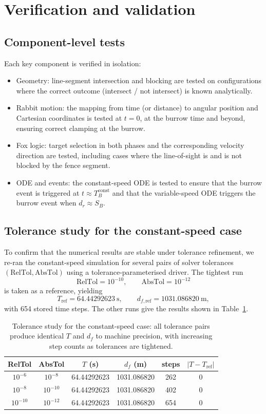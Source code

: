 \documentclass[a4paper,11pt]{article}
\begin{document}
\section{Verification and validation}

\subsection{Component-level tests}

Each key component is verified in isolation:

\begin{itemize}
  \item Geometry: line-segment intersection and blocking are tested on configurations where the correct outcome (intersect / not intersect) is known analytically.
  \item Rabbit motion: the mapping from time (or distance) to angular position and Cartesian coordinates is tested at $t=0$, at the burrow time and beyond, ensuring correct clamping at the burrow.
  \item Fox logic: target selection in both phases and the corresponding velocity direction are tested, including cases where the line-of-sight is and is not blocked by the fence segment.
  \item ODE and events: the constant-speed ODE is tested to ensure that the burrow event is triggered at $t\approx T_B^{\text{const}}$ and that the variable-speed ODE triggers the burrow event when $d_r\approx S_B$.
\end{itemize}

\subsection{Tolerance study for the constant-speed case}

To confirm that the numerical results are stable under tolerance refinement, we re-ran the constant-speed simulation for several pairs of solver tolerances $(\text{RelTol},\text{AbsTol})$ using a tolerance-parameterised driver. The tightest run
\[
\text{RelTol} = 10^{-10},\qquad \text{AbsTol} = 10^{-12}
\]
is taken as a reference, yielding
\[
T_\text{ref} = 64.44292623\ \text{s},\qquad d_{f,\text{ref}} = 1031.086820\ \text{m},
\]
with 654 stored time steps. The other runs give the results shown in Table~\ref{tab:tolerance}.

\begin{table}[h]
\centering
\begin{tabular}{cccccc}
\hline
RelTol & AbsTol & $T$ (s) & $d_f$ (m) & steps & $|T-T_\text{ref}|$ \\
\hline
$10^{-6}$  & $10^{-8}$  & 64.44292623 & 1031.086820 & 262 & 0 \\
$10^{-8}$  & $10^{-10}$ & 64.44292623 & 1031.086820 & 402 & 0 \\
$10^{-10}$ & $10^{-12}$ & 64.44292623 & 1031.086820 & 654 & 0 \\
\hline
\end{tabular}
\caption{Tolerance study for the constant-speed case: all tolerance pairs produce identical $T$ and $d_f$ to machine precision, with increasing step counts as tolerances are tightened.}
\label{tab:tolerance}
\end{table}
\end{document}
